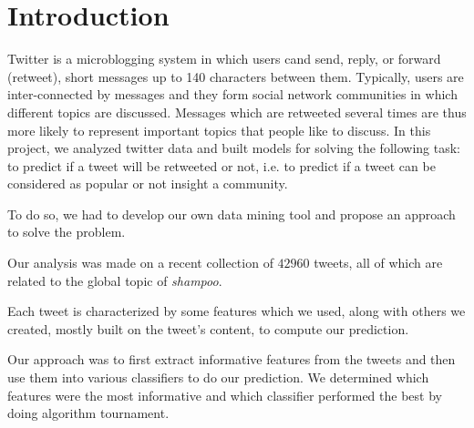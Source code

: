 \section{Introduction}

Twitter is a microblogging system in which users cand send, reply, or forward
(retweet), short messages up to 140 characters between them. Typically, users
are inter-connected by messages and they form social network communities in
which different topics are discussed. Messages which are retweeted several times
are thus more likely to represent important topics that people like to discuss.
In this project, we analyzed twitter data and built models for solving 
the following task: to predict if a tweet will be retweeted or not, i.e. to 
predict if a tweet can be considered as popular or not insight a community.

To do so, we had to develop our own data mining tool and propose an
approach to solve the problem.

Our analysis was made on a recent collection of $42960$ tweets, all of which 
are related to the global topic of \textit{shampoo}.

Each tweet is characterized by some features which we used, along with others 
we created, mostly built on the tweet's content, to compute our prediction.

Our approach was to first extract informative features from the tweets and then 
use them into various classifiers to do our prediction. We determined which 
features were the most informative and which classifier performed the best by 
doing algorithm tournament.